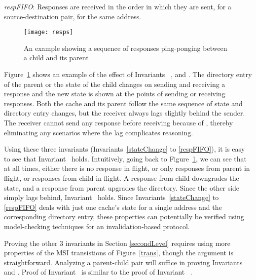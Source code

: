\begin{inv}
\textit{respFIFO}: Responses are received in the order in which they are sent,
for a source-destination pair, for the same address.
\label{respFIFO}
\end{inv}

\begin{figure}
\centering
\texttt{[image: resps]}
\caption{An example showing a sequence of responses ping-ponging between a child and its parent
}
\label{resps}
\end{figure}

Figure~\ref{resps} shows an example of the effect of Invariants~
,  and . The directory
entry of the parent or the state of the child changes on sending and receiving
a response and the new state is shown at the points of sending or receiving
responses.
Both the cache and its parent follow the same sequence of state and directory
entry changes, but the receiver always lags slightly behind the sender.
The receiver cannot send any response before receiving because of
, thereby eliminating any scenarios where the lag complicates
reasoning.

Using these three invariants (Invariants~\ref{stateChange} to \ref{respFIFO}), it
is easy to see that Invariant~ holds. Intuitively, going
back to Figure~\ref{resps}, we can see that at all times, either there is no
response in flight, or only responses from parent in flight, or responses from
child in flight. A response from child downgrades the state, and a response from
parent upgrades the directory. Since the other side simply lags behind,
Invariant~ holds. Since Invariants~\ref{stateChange} to
\ref{respFIFO} deals with just one cache's state for a single address and the
corresponding directory entry, these properties can potentially be verified
using model-checking techniques for an invalidation-based protocol.

Proving the other 3 invariants in Section \ref{secondLevel} requires using
more properties of the MSI transistions of Figure~\ref{trans}, though the argument is
straightforward. Analyzing a parent-child pair will suffice in proving Invariants~
 and . Proof of Invariant~
 is similar to the proof of Invariant~
.

